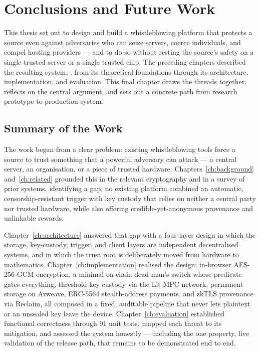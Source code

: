 \chapter{Conclusions and Future Work}
\label{ch:conclusions}

This thesis set out to design and build a whistleblowing platform that protects a
source even against adversaries who can seize servers, coerce individuals, and
compel hosting providers --- and to do so without resting the source's safety on a
single trusted server or a single trusted chip. The preceding chapters described
the resulting system, \zkwns, from its theoretical foundations through its
architecture, implementation, and evaluation. This final chapter draws the threads
together, reflects on the central argument, and sets out a concrete path from
research prototype to production system.

\section{Summary of the Work}
\label{sec:concl-summary}

The work began from a clear problem: existing whistleblowing tools force a source
to trust something that a powerful adversary can attack --- a central server, an
organisation, or a piece of trusted hardware. Chapters~\ref{ch:background}
and~\ref{ch:related} grounded this in the relevant cryptography and in a
survey of prior systems, identifying a gap: no existing platform combined an
automatic, censorship-resistant trigger with key custody that relies on neither a
central party nor trusted hardware, while also offering credible-yet-anonymous
provenance and unlinkable rewards.

Chapter~\ref{ch:architecture} answered that gap with a four-layer design in which
the storage, key-custody, trigger, and client layers are independent decentralised
systems, and in which the trust root is deliberately moved from hardware to
mathematics. Chapter~\ref{ch:implementation} realised the design: in-browser
AES-256-GCM encryption, a minimal on-chain dead man's switch whose \isdeceased
predicate gates everything, threshold key custody via the Lit MPC network,
permanent storage on Arweave, ERC-5564 stealth-address payments, and zkTLS
provenance via Reclaim, all composed in a fixed, auditable pipeline that never lets
plaintext or an unsealed key leave the device. Chapter~\ref{ch:evaluation}
established functional correctness through 91 unit tests, mapped each threat to its
mitigation, and assessed the system honestly --- including the one property, live
validation of the release path, that remains to be demonstrated end to end.

